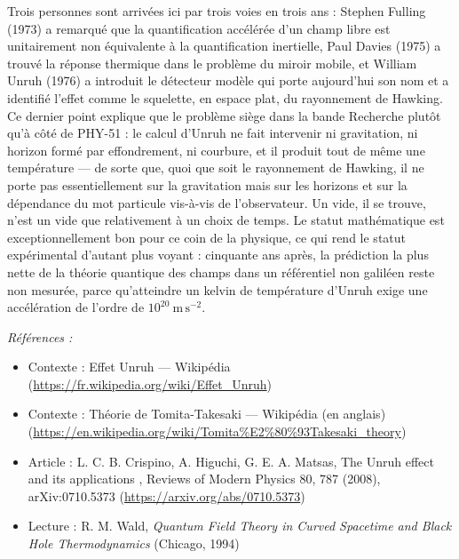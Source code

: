\documentclass[11pt]{article}
\newenvironment{refs}{\par\small\noindent\emph{Références :}\begin{itemize}\setlength\itemsep{0pt}}{\end{itemize}\normalsize}
\begin{document}
\noindent Trois personnes sont arrivées ici par trois voies en trois ans : Stephen
Fulling (1973) a remarqué que la quantification accélérée d'un champ libre est unitairement non
équivalente à la quantification inertielle, Paul Davies (1975) a trouvé la réponse thermique dans
le problème du miroir mobile, et William Unruh (1976) a introduit le détecteur modèle qui porte
aujourd'hui son nom et a identifié l'effet comme le squelette, en espace plat, du rayonnement de
Hawking. Ce dernier point explique que le problème siège dans la bande Recherche plutôt qu'à côté
de PHY-51 : le calcul d'Unruh ne fait intervenir ni gravitation, ni horizon formé par effondrement,
ni courbure, et il produit tout de même une température --- de sorte que, quoi que soit le
rayonnement de Hawking, il ne porte pas essentiellement sur la gravitation mais sur les horizons et
sur la dépendance du mot \og{} particule \fg{} vis-à-vis de l'observateur. Un vide, il se trouve, n'est un
vide que relativement à un choix de temps. Le statut mathématique est exceptionnellement bon pour
ce coin de la physique, ce qui rend le statut expérimental d'autant plus voyant : cinquante ans
après, la prédiction la plus nette de la théorie quantique des champs dans un référentiel non
galiléen reste non mesurée, parce qu'atteindre un kelvin de température d'Unruh exige une
accélération de l'ordre de $10^{20}\ \mathrm{m\,s^{-2}}$.

\begin{refs}
\item Contexte : Effet Unruh --- Wikipédia (\url{https://fr.wikipedia.org/wiki/Effet_Unruh})
\item Contexte : Théorie de Tomita-Takesaki --- Wikipédia (en anglais) (\url{https://en.wikipedia.org/wiki/Tomita%E2%80%93Takesaki_theory})
\item Article : L. C. B. Crispino, A. Higuchi, G. E. A. Matsas, \og{} The Unruh effect and its applications \fg{}, Reviews of Modern Physics 80, 787 (2008), arXiv:0710.5373 (\url{https://arxiv.org/abs/0710.5373})
\item Lecture : R. M. Wald, \textit{Quantum Field Theory in Curved Spacetime and Black Hole Thermodynamics} (Chicago, 1994)
\end{refs}

\bigskip
\end{document}
